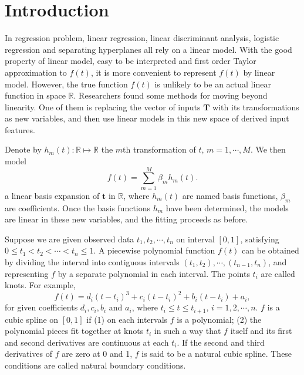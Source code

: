 
\section{Introduction}


In regression problem, linear regression, linear discriminant analysis, logistic regression and separating hyperplanes all rely on a linear model. With the good property of linear model, easy to be interpreted and first order Taylor approximation to $f(t)$, it is more convenient to represent $f(t)$ by linear model. However, the true function $f(t)$ is unlikely to be an actual linear function in space $\mathbb{R}$. Researchers found some methods for moving beyond linearity. One of them is replacing the vector of inputs $\mathbf{T}$ with its transformations as new variables, and then use linear models in this new space of derived input features.

Denote by $h_m(t):\mathbb{R} \mapsto \mathbb{R}$ the $m$th transformation of $t$, $m =1, \cdots ,M$. We then model
\begin{equation}\label{fbasis}
f(t) =\sum_{m=1}^{M}\beta_mh_m(t).
\end{equation}
a linear basis expansion of $\mathbf{t}$ in $\mathbb{R}$, where $h_m(t)$ are named basis functions, $\beta_m$ are coefficients. Once the basis functions $h_m$ have been determined, the models are linear in these new variables, and the fitting proceeds as before.

Suppose we are given observed data $t_1,t_2, \cdots, t_n$ on interval $[0,1]$, satisfying $0\leq t_1< t_2 < \cdots <t_n \leq 1$. A piecewise polynomial function $f(t)$ can be obtained by dividing the interval into contiguous
intervals $(t_1,t_2),\cdots,(t_{n-1},t_n)$, and representing $f$ by a separate polynomial in each interval. The points $t_i$ are called knots. For example,
\begin{equation}
f(t)=d_i(t-t_i)^3+c_i(t-t_i)^2+b_i(t-t_i)+a_i,
\end{equation}
for given coefficients $d_i, c_i, b_i$ and $a_i$, where $t_i\leq t\leq t_{i+1}$, $i=1,2,\cdots,n$. $f$ is a cubic spline on $[0,1]$ if (1) on each intervals $f$ is a polynomial; (2) the polynomial pieces fit together at knots $t_i$ in such a way that $f$ itself and its first and second derivatives are continuous at each $t_i$. If the second and third derivatives of $f$ are zero at 0 and 1, $f$ is said to be a natural cubic spline. These conditions are called natural boundary conditions.

